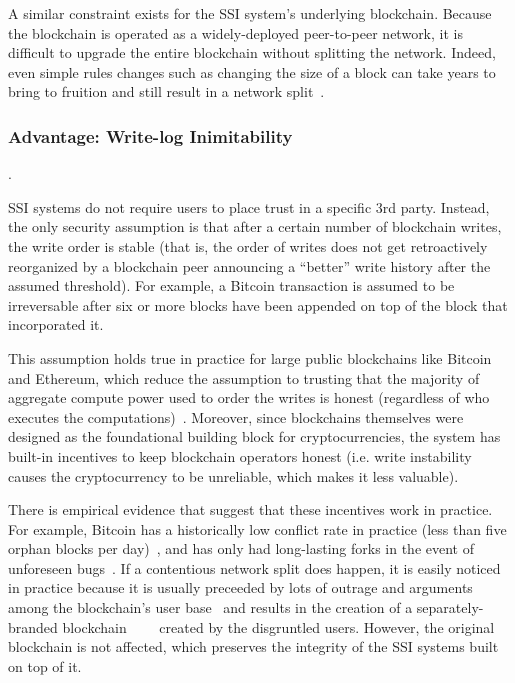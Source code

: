 A similar constraint exists for the SSI system's underlying blockchain.
Because the blockchain is operated as a widely-deployed peer-to-peer network,
it is difficult to upgrade the entire blockchain without splitting the network.
Indeed, even simple rules changes such as changing the size of a block can take 
years to bring to fruition and still result in a network
split~\cite{bitcoin-cash-split}.

\subsubsection{Advantage: Write-log Inimitability}.

SSI systems do not require users to place trust in a specific 3rd
party.  Instead, the only security assumption is that after a certain number
of blockchain writes, the write order is stable (that is, the order of writes does not get
retroactively reorganized by a blockchain peer announcing a ``better'' write
history after the assumed threshold).  For example, a Bitcoin transaction is
assumed to be irreversable after six or more blocks have been appended on top of
the block that incorporated it.

This assumption holds true in
practice for large public blockchains like Bitcoin and Ethereum, which reduce the assumption to trusting
that the majority of aggregate compute power used to order the writes is honest
(regardless of who executes the computations)~\cite{proof-of-work}.  Moreover,
since blockchains themselves were designed as the foundational building block for
cryptocurrencies, the system has built-in incentives to keep blockchain
operators honest (i.e. write instability causes the cryptocurrency to be
unreliable, which makes it less valuable).

There is empirical evidence that suggest that these incentives work in practice.  For
example, Bitcoin has a historically low conflict rate in practice
(less than five orphan blocks per
day)~\cite{blockchain-info-orphan-rate}, and has only had long-lasting forks in
the event of unforeseen bugs~\cite{bitcoin-deep-fork}.  If a contentious network
split does happen, it is easily noticed in practice because it is usually
preceeded by lots of outrage and arguments among the blockchain's user
base~\cite{bitcoin-controversies} and results in the creation of a
separately-branded
blockchain~\cite{bitcoin-cash}~\cite{ethereum-classic}~\cite{zcash-classic}~\cite{expanse}
created by the disgruntled users.  However, the original blockchain is not
affected, which preserves the integrity of the SSI systems built on top of it.

